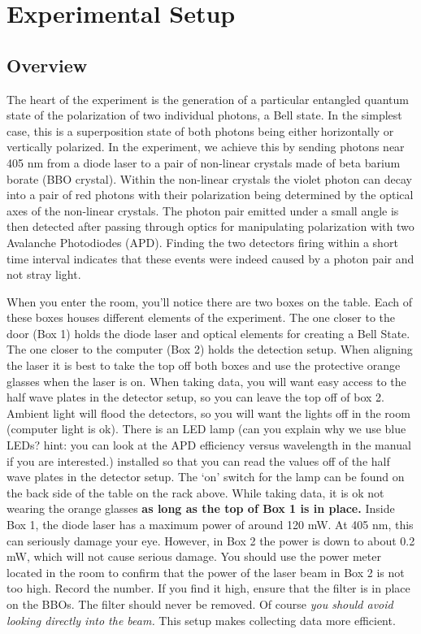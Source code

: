 \documentclass{../lab}
\begin{document}
\section{Experimental Setup}

\subsection{Overview}

The heart of the experiment is the generation of a particular entangled quantum state of the polarization of two individual photons, a Bell state. In the simplest case, this is a superposition state of both photons being either horizontally or vertically polarized. In the experiment, we achieve this by sending photons near 405 nm from a diode laser to a pair of non-linear crystals made of beta barium borate (BBO crystal). Within the non-linear crystals the violet photon can decay into a pair of red photons with their polarization being determined by the optical axes of the non-linear crystals. The photon pair emitted under a small angle is then detected after passing through optics for manipulating polarization with two Avalanche Photodiodes (APD). Finding the two detectors firing within a short time interval indicates that these events were indeed caused by a photon pair and not stray light.

When you enter the room, you'll notice there are two boxes on the table. Each of these boxes houses different elements of the experiment. The one closer to the door (Box 1) holds the diode laser and optical elements for creating a Bell State. The one closer to the computer (Box 2) holds the detection setup. When aligning the laser it is best to take the top off both boxes and use the protective orange glasses when the laser is on. When taking data, you will want easy access to the half wave plates in the detector setup, so you can leave the top off of box 2. Ambient light will flood the detectors, so you will want the lights off in the room (computer light is ok). There is an LED lamp (can you explain why we use blue LEDs? hint: you can look at the APD efficiency versus wavelength in the manual if you are interested.) installed so that you can read the values off of the half wave plates in the detector setup. The `on' switch for the lamp can be found on the back side of the table on the rack above. While taking data, it is ok not wearing the orange glasses \textbf{as long as the top of Box 1 is in place.} Inside Box 1, the diode laser has a maximum power of around 120 mW. At 405 nm, this can seriously damage your eye. However, in Box 2 the power is down to about 0.2 mW, which will not cause serious damage. You should use the power meter located in the room to confirm that the power of the laser beam in Box 2 is not too high. Record the number. If you find it high, ensure that the filter is in place on the BBOs. The filter should never be removed. Of course \emph{you should avoid looking directly into the beam.} This setup makes collecting data more efficient.
\end{document}
